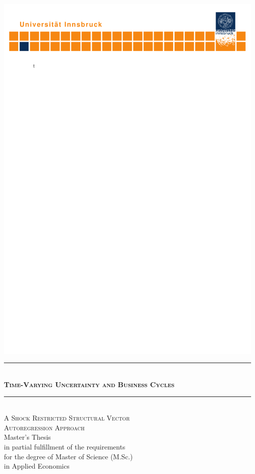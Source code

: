 \documentclass[a4paper,11pt,listof=nochaptergap,oneside,pointednumbers,bibtotoc,bigheadings,liststotoc]{scrbook}
\theoremstyle{mysatz}
\theoremstyle{mydefinition}
\theoremstyle{mybemerkung}
\begin{document}
\begin{titlepage}
    \begin{center}
        \hspace*{-0.27\textwidth}\includegraphics[width=1.419\textwidth, trim = 5mm 250mm 0mm 0mm, clip = TRUE]{logo.pdf}\hspace*{-0.3\textwidth}
        \quad \\[0mm]
        \newcommand{\HRule}{\rule{\linewidth}{0.3mm}} %
        \HRule \\[-1mm]
        \Huge{\scshape\bfseries Time-Varying Uncertainty and Business Cycles} \\[-5mm]
        \HRule \\[2mm]
        \Large {\scshape A Shock Restricted Structural Vector \\
        				Autoregression Approach} \\[10mm]
        \Large Master's Thesis \\[10mm]
        \Large in partial fulfillment of the requirements \\for the degree of Master of Science (M.Sc.)\\
                  in Applied Economics \\[10mm]
                  

\end{center}
\end{titlepage}
\end{document}
